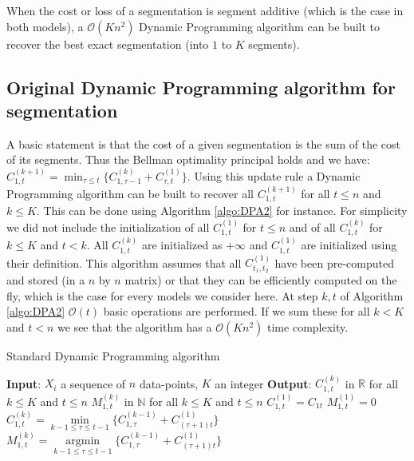 \documentclass[article,10pt]{llncs}
\begin{document}
When the cost or loss of a segmentation is segment additive (which is the case in both models), a $\mathcal{O}(Kn^2)$ Dynamic Programming algorithm can be built to recover the best exact segmentation (into $1$ to $K$ segments).

\subsection{Original Dynamic Programming algorithm for segmentation}

A basic statement is that the cost of a given segmentation is the sum of the cost of its segments. 
Thus the Bellman optimality principal holds and we have:
$ C_{1, t}^{(k+1)} = \min_{\tau \leq t} \{ C_{1, \tau -1}^{(k)}  + C_{\tau, t}^{(1)} \} .$
Using this update rule  a Dynamic Programming algorithm can be built to recover all $ C_{1, t}^{(k+1)}$ for all $t \leq n$ and $k \leq K$.
This can be done using Algorithm \ref{algo:DPA2} for instance. 
For simplicity we did not include the initialization of all $C^{(1)}_{1,t}$ for $t \leq n$ and of all $C^{(k)}_{1,t}$ for $k \leq K$ and $t < k$.
All $C^{(k)}_{1,t}$ are initialized as $+\infty$ and $C^{(1)}_{1,t}$ are initialized using their definition.
This algorithm assumes that all $C_{t_1, t_2}^{(1)}$ have been pre-computed and stored (in 
a $n$ by $n$ matrix) or that they can be efficiently computed on the fly, which is the case for every models we consider here. At step $k, t$ of Algorithm \ref{algo:DPA2}  $\mathcal{O}(t)$ basic operations are performed. If we sum these for all $k < K$ and $t < n$  we see that the algorithm has a $\mathcal{O}(Kn^2)$ time complexity. 

\begin{algorithm}
  \caption{Standard Dynamic Programming algorithm}\label{algo:DPA2}
  \begin{algorithmic}
    \State \textbf{Input}: $X_i$ a sequence of $n$ data-points, $K$ an integer
    \State \textbf{Output}: $C^{(k)}_{1,t}$ in $\mathbb{R}$ for all $k \leq K$ and $t \leq n$
    \State $M^{(k)}_{1,t}$ in $\mathbb{N}$ for all $k \leq K$ and $t \leq n$
         \State $C^{(1)}_{1,t} = C_{1t}$ 
         \State $M^{(1)}_{1,t} = 0$  
    \EndFor
     	\State $C^{(k)}_{1,t} = \underset{k-1 \leq \tau \leq t-1}{\min} \{ C^{(k-1)}_{1,\tau}+ C_{(\tau+1)t}^{(1)} \}$ 
        \State $M^{(k)}_{1,t} =\underset{k-1 \leq \tau \leq t-1}{\operatorname{argmin}} \{ C^{(k-1)}_{1,\tau}+ C_{(\tau+1)t}^{(1)} \}$ 
        \EndFor
   
     \EndFor
  \end{algorithmic}
\end{algorithm}
\end{document}
